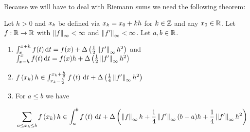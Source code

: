 Because we will have to deal with Riemann sums we need the following theorem:

\begin{theorem} \label{thm:arithmetic_rules}
  Let $h > 0$ and $\x[k]$ be defined via $\x[k] = \x[0] + kh$ for $k\in\Z$ and any $\x[0]\in\R$. Let $f:\R\to\R$ with $\snorm{f} < \infty$ and $\snorm{f'} < \infty$. Let $a,b\in\R$.

  \begin{enumerate}
    \item $\int_x^{x+h} f(t) \d{t} = f(x) + \bigabs{\frac 12 \snorm{f'} h^2}$ and $\int_{x-h}^x f(t) \d{t} = f(x) h + \bigabs{\frac 12 \snorm{f'} h^2}$
    \item $\f{\x} h \in \int_{\x-\frac h2}^{\x + \frac h2} \f{t}\d{t} + \bigabs{\frac 14 \snorm{f'} h^2}$
    \item For $a \le b$ we have

      \begin{align}
        \sum_{a \le \x \le b} \f{\x} h \in \int_a^b \f{t}\d{t} + \bigabs{\snorm{f} h + \frac 14 \snorm{f'}(b-a)h + \frac 14 \snorm{f'}h^2}
      \end{align}
  \end{enumerate}
\end{theorem}

